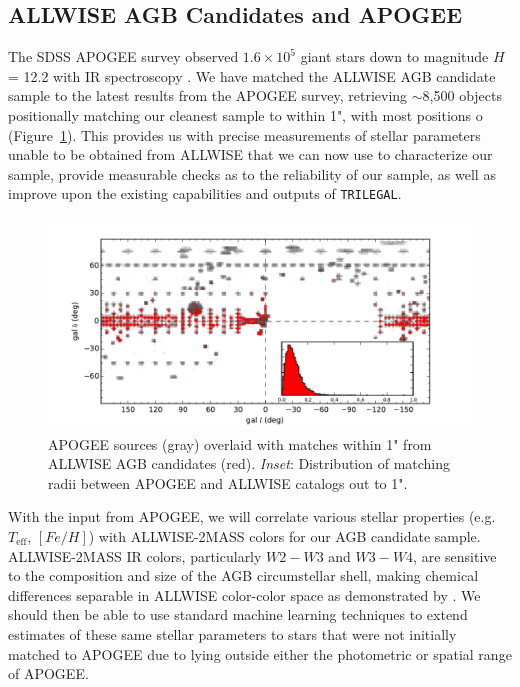 \subsection{ALLWISE AGB Candidates and APOGEE}
\label{sec:apogee}
The SDSS APOGEE survey observed $1.6\times10^5$ giant stars down to magnitude $H$ = 12.2 with IR spectroscopy \citep{2012ApJ...755L..25N}. We have matched the ALLWISE AGB candidate sample to the latest results from the APOGEE survey, retrieving $\sim$8,500 objects positionally matching our cleanest sample to within 1", with most positions o (Figure~\ref{fig:apogee_allwise}).  This provides us with precise measurements of stellar parameters unable to be obtained from ALLWISE that we can now use to characterize our sample, provide measurable checks as to the reliability of our sample, as well as improve upon the existing capabilities and outputs of {\tt TRILEGAL}.

\begin{figure}[h]
\centering
\includegraphics[width=6.5in]{figs/apogee_allwise_overlay.pdf}
\caption{{\footnotesize APOGEE sources (gray) overlaid with matches within 1" from ALLWISE AGB candidates (red). \emph{Inset}: Distribution of matching radii between APOGEE and ALLWISE catalogs out to 1".}}
\label{fig:apogee_allwise}
\end{figure}

With the input from APOGEE, we will correlate various stellar properties (e.g. $T_\text{eff}$, $[Fe/H]$) with ALLWISE-2MASS colors for our AGB candidate sample. ALLWISE-2MASS IR colors, particularly $W2-W3$ and $W3-W4$, are sensitive to the composition and size of the AGB circumstellar shell, making chemical differences separable in ALLWISE color-color space as demonstrated by \cite{2014MNRAS.442.3361N}. We should then be able to use standard machine learning techniques \citep[e.g. those found in ][]{2013sdmm.book.....I} to extend estimates of these same stellar parameters to stars that were not initially matched to APOGEE due to lying outside either the photometric or spatial range of APOGEE.

